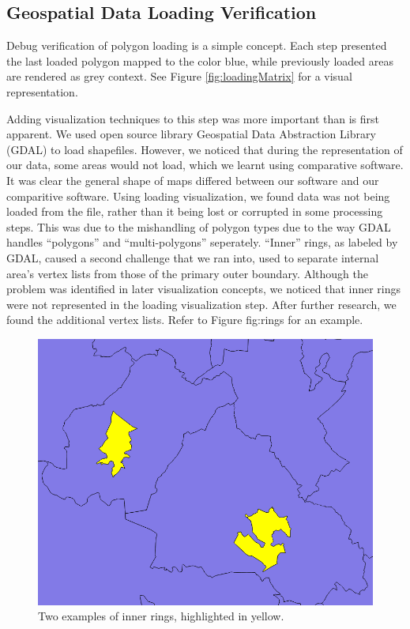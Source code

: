 \subsection{Geospatial Data Loading Verification}
Debug verification of polygon loading is a simple concept. Each step presented the last loaded polygon mapped to the color blue, while previously loaded areas are rendered as grey context. See Figure \ref{fig:loadingMatrix} for a visual representation.

Adding visualization techniques to this step was more important than is first apparent. We used open source library Geospatial Data Abstraction Library (GDAL) \cite{GDAL} to load shapefiles. However, we noticed that during the representation of our data, some areas would not load, which we learnt using comparative software. It was clear the general shape of maps differed between our software and our comparitive software. Using loading visualization, we found data was not being loaded from the file, rather than it being lost or corrupted in some processing steps. This was due to the mishandling of polygon types due to the way GDAL handles ``polygons'' and ``multi-polygons'' seperately. ``Inner'' rings, as labeled by GDAL, caused a second challenge that we ran into, used to separate internal area's vertex lists from those of the primary outer boundary. Although the problem was identified in later visualization concepts, we noticed that inner rings were not represented in the loading visualization step. After further research, we found the additional vertex lists. Refer to Figure {fig:rings} for an example.

\begin{figure}[b]
\includegraphics[width=0.4\linewidth]{images/ch6/innerRings}
\caption{Two examples of inner rings, highlighted in yellow.} \label{fig:rings}
\end{figure}

